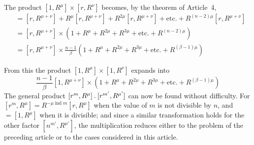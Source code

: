 \clearpage
{}
The product $[1,R^\mu]\times[r,R^\nu]$ becomes, by the theorem of Article~4,
\[
\begin{aligned}
&=[r,R^{\mu+\nu}]+R^\mu[r,R^{\mu+\nu}]+R^{2\mu}[r,R^{\mu+\nu}]+\text{etc.}+R^{(n-2)\mu}[r,R^{\mu+\nu}]\\
&=[r,R^{\mu+\nu}]\times(1+R^\mu+R^{2\mu}+R^{3\mu}+\text{etc.}+R^{(n-2)\mu})\\
&=[r,R^{\mu+\nu}]\times\frac{n-1}\beta(1+R^\mu+R^{2\mu}+R^{3\mu}+\text{etc.}+R^{(\beta-1)\mu})
\end{aligned}
\]

From this the product $[1,R^\mu]\times[1,R^\nu]$ expands into
\[
\frac{n-1}\beta[1,R^{\mu+\nu}]\times(1+R^\mu+R^{2\mu}+R^{3\mu}+\text{etc.}+R^{(\beta-1)\mu})
\]
The general product $[r^m,R^\mu]\mathbin{.}[r^{m'},R^{\mu'}]$ can now be found without difficulty. For $[r^m,R^\mu]=R^{-\mu\operatorname{ind}m}[r,R^\mu]$ when the value of $m$ is not divisible by $n$, and $=[1,R^\mu]$ when it is divisible; and since a similar transformation holds for the other factor $[n^{m'},R^{\mu'}]$, the multiplication reduces either to the problem of the preceding article or to the cases considered in this article.
